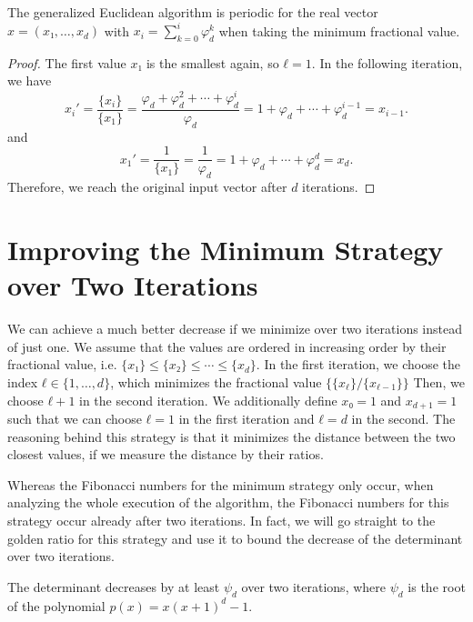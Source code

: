 \begin{theorem}
  The generalized Euclidean algorithm is periodic for the real vector $x = (x₁, …, x_d)$
  with $x_i = \sum_{k=0}^i φ_d^k$ when taking the minimum fractional value.
\end{theorem}

\begin{proof}
  The first value $x₁$ is the smallest again, so $ℓ = 1$.
  In the following iteration, we have
  \[
    x_i' = \frac{\{x_i\}}{\{x_1\}} = \frac{φ_d + φ_d^2 + ⋯ + φ_d^i}{φ_d} = 1 + φ_d + ⋯ + φ_d^{i-1} = x_{i-1}.
  \]
  and
  \[
    x_1' = \frac{1}{\{x_1\}} = \frac{1}{φ_d} = 1 + φ_d + ⋯ + φ_d^d = x_d.
  \]
  Therefore, we reach the original input vector after $d$ iterations.
\end{proof}


\section{Improving the Minimum Strategy over Two Iterations}

We can achieve a much better decrease if we minimize over two iterations instead of just one.
We assume that the values are ordered in increasing order by their fractional
value, i.e. $\{x₁\} ≤ \{x₂\} ≤ ⋯ ≤ \{x_d\}$.
In the first iteration, we choose the index $ℓ ∈ \{1, …, d\}$,
which minimizes the fractional value $\{\{x_ℓ\}/\{x_{ℓ-1}\}\}$
Then, we choose $ℓ + 1$ in the second iteration.
We additionally define $x₀ = 1$ and $x_{d+1} = 1$ such that we can choose $ℓ = 1$ in the first iteration and $ℓ = d$ in the second.
The reasoning behind this strategy is that it minimizes the distance between the two closest values,
if we measure the distance by their ratios.

Whereas the Fibonacci numbers for the minimum strategy only occur,
when analyzing the whole execution of the algorithm,
the Fibonacci numbers for this strategy occur already after two iterations.
In fact, we will go straight to the golden ratio for this strategy and use it
to bound the decrease of the determinant over two iterations.

\begin{theorem}
  The determinant decreases by at least $ψ_d$ over two iterations,
  where $ψ_d$ is the root of the polynomial $p(x) = x(x+1)^d - 1$.
\end{theorem}

